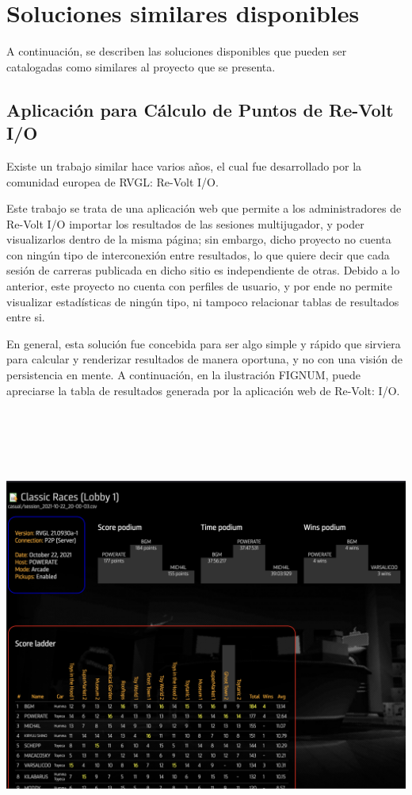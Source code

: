 \section{Soluciones similares disponibles}
A continuación, se describen las soluciones disponibles que pueden ser catalogadas como similares al proyecto que se presenta.

\subsection{Aplicación para Cálculo de Puntos de Re-Volt I/O}
Existe un trabajo similar hace varios años, el cual fue desarrollado por la comunidad europea de RVGL: Re-Volt I/O.

Este trabajo se trata de una aplicación web que permite a los administradores de Re-Volt I/O importar los resultados de las sesiones multijugador, y poder visualizarlos dentro de la misma página; sin embargo, dicho proyecto no cuenta con ningún tipo de interconexión entre resultados, lo que quiere decir que cada sesión de carreras publicada en dicho sitio es independiente de otras. Debido a lo anterior, este proyecto no cuenta con perfiles de usuario, y por ende no permite visualizar estadísticas de ningún tipo, ni tampoco relacionar tablas de resultados entre si.

En general, esta solución fue concebida para ser algo simple y rápido que sirviera para calcular y renderizar resultados de manera oportuna, y no con una visión de persistencia en mente. A continuación, en la ilustración FIGNUM, puede apreciarse la tabla de resultados generada por la aplicación web de Re-Volt: I/O.

\includegraphics[width=17cm, height=15cm]{img/io-results.png}

